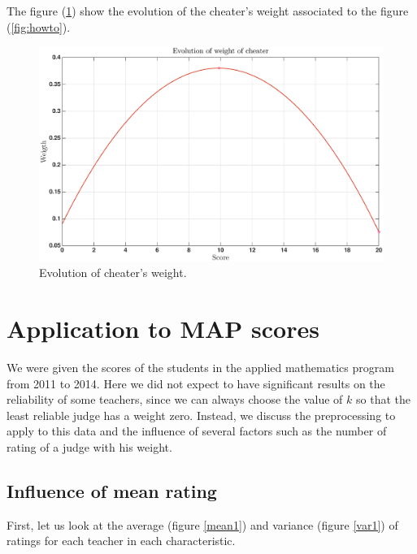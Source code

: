 \documentclass[12pt,a4paper]{article}
\begin{document}
The figure (\ref{fig:howto_weight}) show the evolution of the cheater's weight associated to the figure (\ref{fig:howto}).

\begin{figure}[ht!]
\centering
\includegraphics[width = 1\textwidth]{cheaters/evolution_cheater_weight.eps}
\caption{Evolution of cheater's weight.}
\label{fig:howto_weight}
\end{figure}

\clearpage
\section{Application to MAP scores}
We were given the scores of the students in the applied mathematics program from 2011 to 2014. Here we did not expect to have significant results on the reliability of some teachers, since we can always choose the value of $k$ so that the least reliable judge has a weight zero. Instead, we discuss the preprocessing to apply to this data and the influence of several factors such as the number of rating of a judge with his weight.


\FloatBarrier
\subsection*{Influence of mean rating}
First, let us look at the average (figure \ref{mean1}) and variance (figure \ref{var1}) of ratings for each teacher in each characteristic.
\end{document}
